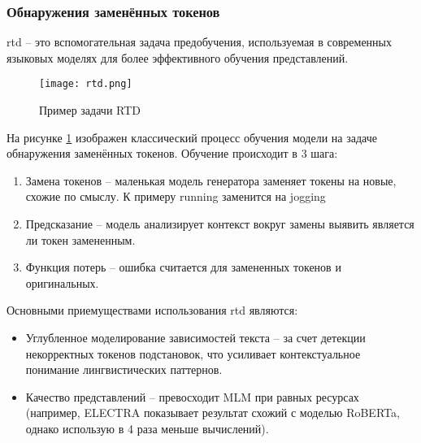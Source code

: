 \documentclass[../part_1.tex]{subfiles}
\begin{document}
\subsubsection{Обнаружения заменённых токенов}
\par \acrfull{rtd} -- это вспомогательная задача предобучения, используемая в современных языковых моделях для более эффективного обучения представлений. 

\begin{figure}[h]
    \centering
    \texttt{[image: rtd.png]}
    \caption{Пример задачи RTD}
    \label{fig:rtd_bert}
\end{figure}

\par На рисунке \ref{fig:rtd_bert} изображен классический процесс обучения модели на задаче обнаружения заменённых токенов. Обучение происходит в 3 шага:
\begin{enumerate}
    \item Замена токенов -- маленькая модель генератора заменяет токены на новые, схожие по смыслу. К примеру running заменится на jogging 
    \item Предсказание -- модель анализирует контекст вокруг замены выявить является ли токен замененным.
    \item Функция потерь -- ошибка считается для замененных токенов и оригинальных.
\end{enumerate}
\par Основными приемуществами использования \acrshort{rtd} являются:
\begin{itemize}
    \item Углубленное моделирование зависимостей текста -- за счет детекции некорректных токенов подстановок, что усиливает контекстуальное понимание лингвистических паттернов.
    \item Качество представлений -- превосходит MLM при равных ресурсах (например, ELECTRA\cite{clark2020electrapretrainingtextencoders} показывает результат схожий с моделью RoBERTa\cite{liu2019robertarobustlyoptimizedbert}, однако использую в 4 раза меньше вычислений).
\end{itemize}
\end{document}
